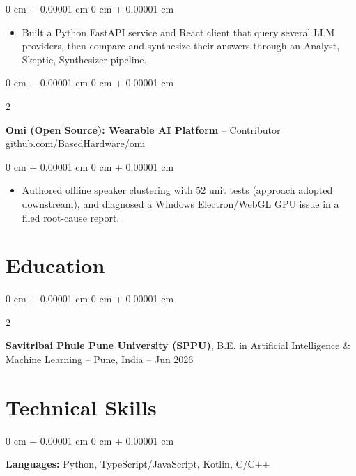\documentclass[10pt, letterpaper]{article}
\newenvironment{highlights}{
    \begin{itemize}[
        topsep=0.10 cm,
        parsep=0.10 cm,
        partopsep=0pt,
        itemsep=0pt,
        leftmargin=0 cm + 10pt
    ]
}{
    \end{itemize}
} %
\newenvironment{onecolentry}{
    \begin{adjustwidth}{
        0 cm + 0.00001 cm
    }{
        0 cm + 0.00001 cm
    }
}{
    \end{adjustwidth}
} %
\newenvironment{twocolentry}[2][]{
    \onecolentry
    \def\secondColumn{#2}
    \setcolumnwidth{\fill, 4.5 cm}
    \begin{paracol}{2}
}{
    \switchcolumn \raggedleft \secondColumn
    \end{paracol}
    \endonecolentry
} %
\begin{document}
        \vspace{0.06 cm}
        \begin{onecolentry}
            \begin{highlights}
                \item Built a Python FastAPI service and React client that query several LLM providers, then compare and synthesize their answers through an Analyst, Skeptic, Synthesizer pipeline.
            \end{highlights}
        \end{onecolentry}

        \vspace{0.12 cm}

        \begin{twocolentry}{
            {\footnotesize\href{https://github.com/BasedHardware/omi}{github.com/BasedHardware/omi}}
        }
            \textbf{Omi (Open Source): Wearable AI Platform} -- Contributor\end{twocolentry}

        \vspace{0.06 cm}
        \begin{onecolentry}
            \begin{highlights}
                \item Authored offline speaker clustering with 52 unit tests (approach adopted downstream), and diagnosed a Windows Electron/WebGL GPU issue in a filed root-cause report.
            \end{highlights}
        \end{onecolentry}

    \section{Education}

        \begin{twocolentry}{
            2022 -- Jun 2026
        }
            \textbf{Savitribai Phule Pune University (SPPU)}, B.E. in Artificial Intelligence \& Machine Learning -- Pune, India\end{twocolentry}

    \section{Technical Skills}

        \begin{onecolentry}
            \textbf{Languages:} Python, TypeScript/JavaScript, Kotlin, C/C++
        \end{onecolentry}
\end{document}

